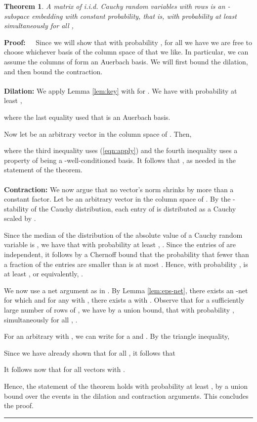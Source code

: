\documentclass[11pt]{article}
\newtheorem{theorem}{Theorem}
\newenvironment{proof}{\begin{trivlist} \item {\bf Proof:~~}}
  {\qed\end{trivlist}}
\def\qed{\hfill\rule{2mm}{2mm}}
\begin{document}
\begin{theorem}\label{thm:l1embed}
A matrix  
of i.i.d. Cauchy random variables with 
 rows is an -subspace embedding with constant probability, that is,
with probability at least  simultaneously 
for all , 
\end{theorem}
\begin{proof}
Since we will show that with probability , for all  we have 
 we are free to
choose whichever basis of the column space of  that we like. 
In particular, we can assume the  columns  
of  form an Auerbach basis. We will first bound the dilation, and then bound the contraction.
\\\\
{\bf Dilation:}
We apply Lemma \ref{lem:key} with  for . 
We have with probability at least ,

where the last equality used that  is an Auerbach basis. 

Now let  be an arbitrary vector in the column space of . Then,

where the third inequality uses (\ref{eqn:apply}) and the fourth inequality uses a property of 
 being a -well-conditioned 
basis. It follows that , as needed in the statement of the theorem.
\\\\
{\bf Contraction:} 
We now argue that no vector's norm shrinks by more than a constant factor. 
Let  be an arbitrary vector in the column space of . By the -stability of the Cauchy distribution, 
each entry of  is distributed as a Cauchy scaled by . 

Since the median of the distribution of the absolute value of a Cauchy random variable is , we have that with 
probability at least , . Since the entries of  are independent, 
it follows by a Chernoff bound that the probability that fewer than a  fraction
of the entries are smaller than  is at most . Hence, with probability ,
 is at least , or equivalently, . 

We now use a net argument as in \cite{sw11}. By Lemma \ref{lem:eps-net},
there exists an -net  
for which  and for any  with , 
there exists a  with
. Observe that for a sufficiently
large  number of rows of , we have by a union bound, that with probability
, simultaneously for all , 
. 

For an arbitrary  with , we can write  for a  and 
. 
By the triangle inequality,  

Since we have already shown that  for all , it follows
that 

It follows now that  for all vectors  with . 

Hence, the statement of the theorem holds with probability at least , by a union bound over the events in the 
dilation and contraction arguments. This concludes the proof. 
\end{proof}
\end{document}
